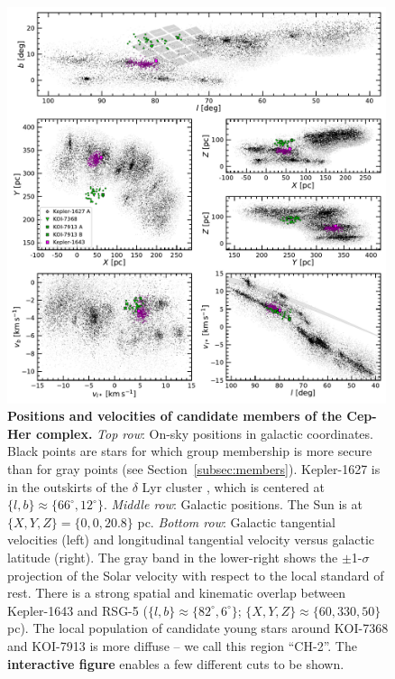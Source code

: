 \documentclass[12pt,twocolumn,linenumbers]{aastex63}
\begin{document}
\begin{figure}[t]
	\begin{center}
		\leavevmode
		\includegraphics[width=0.99\textwidth]{f1.pdf}
	\end{center}
	\vspace{-0.7cm}
	\caption{
  {\bf Positions and velocities of candidate members of the Cep-Her
  complex.}
  {\it Top row}: On-sky positions in galactic coordinates.  Black
  points are stars for which group membership is more secure than for
  gray points (see Section~\ref{subsec:members}).
  Kepler-1627 is in the outskirts of the $\delta$ Lyr cluster
  \citep{bouma_kep1627_2022}, which is centered at $\{ l, b\} \approx
  \{ 66^\circ, 12^\circ\}$.
  {\it Middle row}: Galactic positions.  The Sun is at $\{X, Y, Z\} =
  \{0, 0, 20.8\}$ pc.
  {\it Bottom row}: Galactic tangential velocities (left) and
  longitudinal tangential velocity versus galactic latitude (right).
  The gray band in the lower-right shows the $\pm$1-$\sigma$
  projection of the Solar velocity with respect to the local standard
  of rest.
  There is a strong spatial and kinematic overlap between Kepler-1643
  and RSG-5 ($\{ l, b\} \approx \{ 82^\circ,
  6^\circ\}$; $\{ X, Y, Z\} \approx \{60, 330, 50\} $ pc).  The
  local population of candidate young stars around KOI-7368 and
  KOI-7913 is more diffuse -- we call this region ``CH-2''.
  The {\bf interactive figure} enables a few different cuts to be
  shown.
	\label{fig:XYZvtang}
	}
\end{figure}
\end{document}
